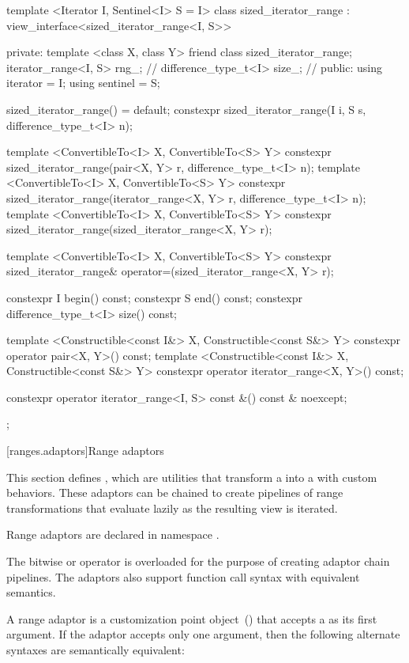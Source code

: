 %
\begin{codeblock}
template <Iterator I, Sentinel<I> S = I>
class sized_iterator_range
  : view_interface<sized_iterator_range<I, S>> {
private:
  template <class X, class Y> friend class sized_iterator_range;
  iterator_range<I, S> rng_; // \expos
  difference_type_t<I> size_; // \expos
public:
  using iterator = I;
  using sentinel = S;

  sized_iterator_range() = default;
  constexpr sized_iterator_range(I i, S s, difference_type_t<I> n);

  template <ConvertibleTo<I> X, ConvertibleTo<S> Y>
    constexpr sized_iterator_range(pair<X, Y> r, difference_type_t<I> n);
  template <ConvertibleTo<I> X, ConvertibleTo<S> Y>
    constexpr sized_iterator_range(iterator_range<X, Y> r, difference_type_t<I> n);
  template <ConvertibleTo<I> X, ConvertibleTo<S> Y>
    constexpr sized_iterator_range(sized_iterator_range<X, Y> r);

  template <ConvertibleTo<I> X, ConvertibleTo<S> Y>
    constexpr sized_iterator_range& operator=(sized_iterator_range<X, Y> r);

  constexpr I begin() const;
  constexpr S end() const;
  constexpr difference_type_t<I> size() const;

  template <Constructible<const I&> X, Constructible<const S&> Y>
    constexpr operator pair<X, Y>() const;
  template <Constructible<const I&> X, Constructible<const S&> Y>
    constexpr operator iterator_range<X, Y>() const;

  constexpr operator iterator_range<I, S> const &() const & noexcept;
};
\end{codeblock}


[ranges.adaptors]{Range adaptors}

\pnum
This section defines , which are utilities that transform a 
into a  with custom behaviors. These adaptors can be chained to create pipelines of
range transformations that evaluate lazily as the resulting view is iterated.

\pnum
Range adaptors are declared in namespace .

\pnum
The bitwise or operator is overloaded for the purpose of creating adaptor chain pipelines. The
adaptors also support function call syntax with equivalent semantics.

\pnum
A range adaptor is a customization point object~() that accepts a  as its
first argument. If the adaptor accepts only one argument, then the following alternate syntaxes
are semantically equivalent:

